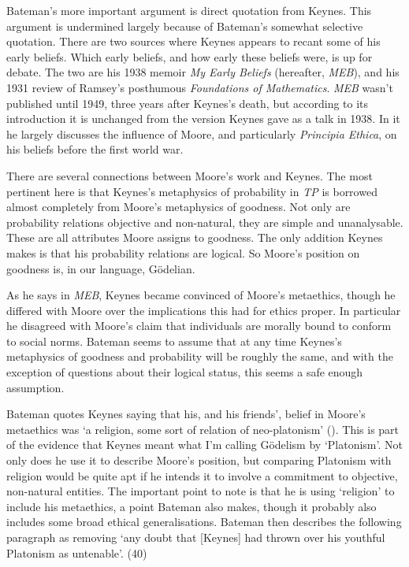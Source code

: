 \documentclass[
  10pt,
  letterpaper,
  DIV=11,
  numbers=noendperiod,
  twoside]{scrartcl}
\begin{document}
Bateman's more important argument is direct quotation from Keynes. This
argument is undermined largely because of Bateman's somewhat selective
quotation. There are two sources where Keynes appears to recant some of
his early beliefs. Which early beliefs, and how early these beliefs
were, is up for debate. The two are his 1938 memoir \emph{My Early
Beliefs} (hereafter, \emph{MEB}), and his 1931 review of Ramsey's
posthumous \emph{Foundations of Mathematics}. \emph{MEB} wasn't
published until 1949, three years after Keynes's death, but according to
its introduction it is unchanged from the version Keynes gave as a talk
in 1938. In it he largely discusses the influence of Moore, and
particularly \emph{Principia Ethica}, on his beliefs before the first
world war.

There are several connections between Moore's work and Keynes. The most
pertinent here is that Keynes's metaphysics of probability in \emph{TP}
is borrowed almost completely from Moore's metaphysics of goodness. Not
only are probability relations objective and non-natural, they are
simple and unanalysable. These are all attributes Moore assigns to
goodness. The only addition Keynes makes is that his probability
relations are logical. So Moore's position on goodness is, in our
language, Gödelian.

As he says in \emph{MEB}, Keynes became convinced of Moore's metaethics,
though he differed with Moore over the implications this had for ethics
proper. In particular he disagreed with Moore's claim that individuals
are morally bound to conform to social norms. Bateman seems to assume
that at any time Keynes's metaphysics of goodness and probability will
be roughly the same, and with the exception of questions about their
logical status, this seems a safe enough assumption.

Bateman quotes Keynes saying that his, and his friends', belief in
Moore's metaethics was `a religion, some sort of relation of
neo-platonism' (). This is
part of the evidence that Keynes meant what I'm calling Gödelism by
`Platonism'. Not only does he use it to describe Moore's position, but
comparing Platonism with religion would be quite apt if he intends it to
involve a commitment to objective, non-natural entities. The important
point to note is that he is using `religion' to include his metaethics,
a point Bateman also makes, though it probably also includes some broad
ethical generalisations. Bateman then describes the following paragraph
as removing `any doubt that {[}Keynes{]} had thrown over his youthful
Platonism as untenable'. (40)
\end{document}
